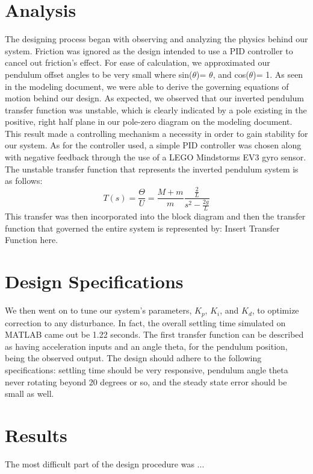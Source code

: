 \documentclass{notes}
\begin{document}
\section{Analysis}  
The designing process began with observing and analyzing the physics behind our system. Friction was ignored as the design intended to use a PID controller to cancel out friction's effect. For ease of calculation, we approximated our pendulum offset angles to be very small where sin($\theta$)= $\theta$, and cos($\theta$)= 1. As seen in the modeling document, we were able to derive the governing equations of motion behind our design. As expected, we observed that our inverted pendulum transfer function was unstable, which is clearly indicated by a pole existing in the positive, right half plane in our pole-zero diagram on the modeling document. This result made a controlling mechanism a necessity in order to gain stability for our system. As for the controller used, a simple PID controller was chosen along with negative feedback through the use of a LEGO Mindstorms EV3 gyro sensor. The unstable transfer function that represents the inverted pendulum system is as follows:
\[
  T(s) = \dfrac{\Theta}{U} = \dfrac{M+m}{m}\dfrac{\frac{2}{L}}{s^2-\frac{2g}{L}}
\]
This  transfer was then incorporated into the block diagram and then the transfer function that governed the entire system is represented by:
Insert Transfer Function here.

\section{Design Specifications}
We then went on to tune our system's parameters, $K_p$, $K_i$, and $K_d$, to optimize correction to any disturbance. In fact, the overall settling time simulated on MATLAB came out be 1.22 seconds. 
The first transfer function can be described as having acceleration inputs and an angle theta, for the pendulum position, being the observed output. The design should adhere to the following specifications: settling time should be very responsive, pendulum angle theta never rotating beyond 20 degrees or so, and the steady state error should be small as well.  

 \section{Results}
The most difficult part of the design procedure was ... 
   
\end{document}
